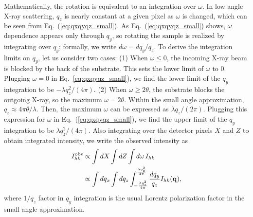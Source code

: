Mathematically, the rotation is  
equivalent to an integration over $\omega$. In low angle X-ray scattering, 
$q_z$ is nearly constant at a given pixel as $\omega$ is changed, which can be seen from 
Eq.~(\ref{eq:qxqyqz_small}). As Eq.~(\ref{eq:qxqyqz_small}) shows, 
$\omega$ dependence appears only through $q_y$, 
so rotating the sample is realized by integrating over $q_y$;
formally, we write $d\omega=dq_y/q_z$.
To derive the integration limits on $q_y$, let us consider two cases: 
(1) When $\omega \leq 0$,
the incoming X-ray beam is blocked by the back of the substrate. This sets 
the lower limit of $\omega$ to 0. Plugging $\omega=0$ in Eq.~\ref{eq:qxqyqz_small}),
we find the lower limit of the $q_y$ integration to be $-\lambda q_z^2/(4\pi)$.
(2) When $\omega \geq 2\theta$, the substrate blocks 
the outgoing X-ray, so the maximum $\omega = 2\theta$. 
Within the small angle approximation, $q_z \approx 4\pi\theta/\lambda$. 
Then, the maximum $\omega$ can be expressed as $\lambda q_z/(2\pi)$.
Plugging this expression for $\omega$ in Eq.~(\ref{eq:qxqyqz_small}),
we find the upper limit of the $q_y$ integration to be $\lambda q_z^2/(4\pi)$.
Also integrating over the detector pixels $X$ and $Z$ to obtain integrated intensity, 
we write the observed intensity as
\begin{align}
  I_{hk}^\textrm{obs} 
    &\propto \int dX \int dZ \int \mathop{d\omega} I_{hk} \nonumber \\
    &\propto \int dq_x \int dq_z 
             \int_{-\frac{\lambda q_z^2}{4\pi}}^{\frac{\lambda q_z^2}{4\pi}} 
             \frac{dq_y}{q_z} 
             I_{hk}(\mathbf{q}),
  \label{eq:I_obs_general}
\end{align}
where $1/q_z$ factor in $q_y$ integration is the usual Lorentz polarization factor
in the small angle approximation. 

